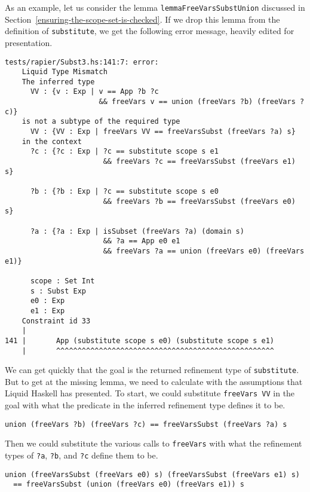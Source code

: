 \documentclass[sigconf, anonymous, review]{acmart}
\newcommand{\tc}[1]{{\small\texttt{#1}}}
\begin{document}
As an example, let us consider the lemma \tc{lemma\-FreeVars\-Subst\-Union} discussed in
Section~\ref{ensuring-the-scope-set-is-checked}.
If we drop this lemma from the definition of \tc{substitute}, we get the following
error message, heavily edited for presentation.

\begin{verbatim}
tests/rapier/Subst3.hs:141:7: error:
    Liquid Type Mismatch
    The inferred type
      VV : {v : Exp | v == App ?b ?c
                      && freeVars v == union (freeVars ?b) (freeVars ?c)}
    is not a subtype of the required type
      VV : {VV : Exp | freeVars VV == freeVarsSubst (freeVars ?a) s}
    in the context
      ?c : {?c : Exp | ?c == substitute scope s e1
                       && freeVars ?c == freeVarsSubst (freeVars e1) s}

      ?b : {?b : Exp | ?c == substitute scope s e0
                       && freeVars ?b == freeVarsSubst (freeVars e0) s}

      ?a : {?a : Exp | isSubset (freeVars ?a) (domain s)
                       && ?a == App e0 e1
                       && freeVars ?a == union (freeVars e0) (freeVars e1)}

      scope : Set Int
      s : Subst Exp
      e0 : Exp
      e1 : Exp
    Constraint id 33
    |
141 |       App (substitute scope s e0) (substitute scope s e1)
    |       ^^^^^^^^^^^^^^^^^^^^^^^^^^^^^^^^^^^^^^^^^^^^^^^^^^^
\end{verbatim}

We can get quickly that the goal is the returned refinement type of \tc{substitute}.
But to get at the missing lemma, we need to calculate with the assumptions that
Liquid Haskell has presented.
To start, we could substitute \tc{freeVars VV} in the goal with what the predicate
in the inferred refinement type defines it to be.

\begin{verbatim}
union (freeVars ?b) (freeVars ?c) == freeVarsSubst (freeVars ?a) s
\end{verbatim}

Then we could substitute the various calls to \tc{freeVars} with what
the refinement types of \tc{?a}, \tc{?b}, and \tc{?c} define them to be.

\begin{verbatim}
union (freeVarsSubst (freeVars e0) s) (freeVarsSubst (freeVars e1) s)
  == freeVarsSubst (union (freeVars e0) (freeVars e1)) s
\end{verbatim}
\end{document}
